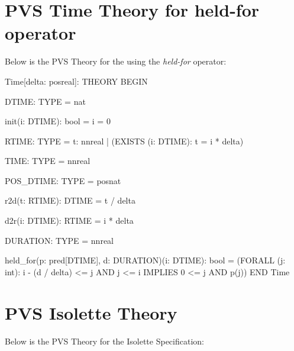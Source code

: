 \documentclass[fontsize=12pt,paper=letter,twoside]{scrartcl}
\begin{document}
\newpage
\appendix

\section{PVS Time Theory for held-for operator}

Below is the PVS Theory for the using the \emph{held-for} operator:\\

\begin{pvs}
Time[delta: posreal]: THEORY
 BEGIN

  DTIME: TYPE = nat

  init(i: DTIME): bool = i = 0

  RTIME: TYPE = {t: nnreal | (EXISTS (i: DTIME): t = i * delta)}

  TIME: TYPE = nnreal

  POS_DTIME: TYPE = posnat

  r2d(t: RTIME): DTIME = t / delta

  d2r(i: DTIME): RTIME = i * delta

  DURATION: TYPE = nnreal

  held_for(p: pred[DTIME], d: DURATION)(i: DTIME): bool =
      (FORALL (j: int):
         i - (d / delta) <= j AND j <= i IMPLIES 0 <= j AND p(j))
 END Time	
\end{pvs}

\newpage
\section{PVS Isolette Theory}

Below is the PVS Theory for the Isolette Specification:\\
\end{document}
